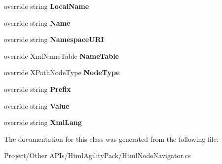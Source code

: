 \begin{DoxyCompactItemize}
\mbox{\label{class_html_agility_pack_1_1_html_node_navigator_acd22c35f48e8c0bdbe265fd1aee95e62}} 
override string {\bfseries Local\+Name}
\item 
\mbox{\label{class_html_agility_pack_1_1_html_node_navigator_a6499ab7553f846642947521f65736a25}} 
override string {\bfseries Name}
\item 
\mbox{\label{class_html_agility_pack_1_1_html_node_navigator_a1f8ee7953643ab1f6bb1239812d22703}} 
override string {\bfseries Namespace\+U\+RI}
\item 
\mbox{\label{class_html_agility_pack_1_1_html_node_navigator_ae34fd99101766a8a3ed5407a4a241d06}} 
override Xml\+Name\+Table {\bfseries Name\+Table}
\item 
\mbox{\label{class_html_agility_pack_1_1_html_node_navigator_a5225af75b5c3247f74310e99c2ec2d1a}} 
override X\+Path\+Node\+Type {\bfseries Node\+Type}
\item 
\mbox{\label{class_html_agility_pack_1_1_html_node_navigator_abe6c60a34381774d1a3301e6f55f7c72}} 
override string {\bfseries Prefix}
\item 
\mbox{\label{class_html_agility_pack_1_1_html_node_navigator_a9e085909421b188bdc28f6f34ce2072e}} 
override string {\bfseries Value}
\item 
\mbox{\label{class_html_agility_pack_1_1_html_node_navigator_ad6be697bf6a02cb6b44aa4d1b5611ebe}} 
override string {\bfseries Xml\+Lang}
\end{DoxyCompactItemize}


The documentation for this class was generated from the following file\+:\begin{DoxyCompactItemize}
\item 
Project/\+Other A\+P\+Is/\+Html\+Agility\+Pack/Html\+Node\+Navigator.\+cs\end{DoxyCompactItemize}
